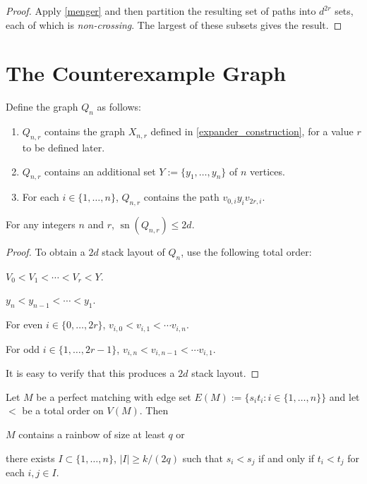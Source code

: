 \documentclass{patmorin}
\DeclareMathOperator{\sn}{sn}
\begin{document}
\begin{proof}
  Apply \cref{menger} and then partition the resulting set of paths into $d^{2r}$ sets, each of which is \emph{non-crossing}.  The largest of these subsets gives the result.
\end{proof}


\section{The Counterexample Graph}

Define the graph $Q_n$ as follows:

\begin{enumerate}
  \item $Q_{n,r}$ contains the graph $X_{n,r}$ defined in  \cref{expander_construction}, for a value $r$ to be defined later.
  \item $Q_{n,r}$ contains an additional set $Y:=\{y_1,\ldots,y_n\}$ of $n$ vertices.
  \item For each $i\in\{1,\ldots,n\}$, $Q_{n,r}$ contains the path $v_{0,i}y_iv_{2r,i}$.
\end{enumerate}


\begin{clm}
  For any integers $n$ and $r$, $\sn(Q_{n,r}) \le 2d$.
\end{clm}

\begin{proof}
  To obtain a $2d$ stack layout of $Q_n$, use the following total order:
  \begin{compactenum}
    \item $V_0 < V_1 <\cdots <V_r < Y$.
    \item $y_n < y_{n-1}<\cdots < y_1$.
    \item For even $i\in\{0,\ldots,2r\}$, $v_{i,0} < v_{i,1} < \cdots v_{i,n}$.
    \item For odd $i\in\{1,\ldots,2r-1\}$, $v_{i,n}< v_{i,n-1} < \cdots v_{i,1}$.
  \end{compactenum}
  It is easy to verify that this produces a $2d$ stack layout.
\end{proof}


\begin{lem}\label{rainbow_alternative}
    Let $M$ be a perfect matching with edge set $E(M):=\{s_it_i:i\in\{1,\ldots,n\}\}$ and let $<$ be a total order on $V(M)$.  Then
    \begin{compactenum}[(i)]
        \item $M$ contains a rainbow of size at least $q$ or
        \item there exists $I\subset\{1,\ldots,n\}$, $|I|\ge k/(2q)$ such that $s_i < s_j$ if and only if $t_i< t_j$ for each $i,j\in I$.
    \end{compactenum}
\end{lem}
\end{document}
